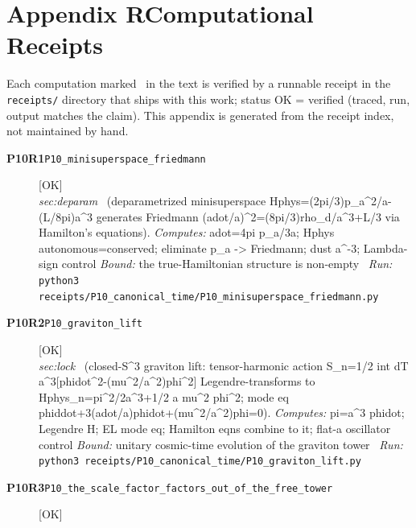 \clearpage
\section*{Appendix R\quad Computational Receipts}\label{app:receipts}
\small\noindent Each computation marked \rcptmarker\ in the text is verified by a runnable receipt in the \texttt{receipts/} directory that ships with this work; status \textsf{OK} = verified (traced, run, output matches the claim). This appendix is generated from the receipt index, not maintained by hand.\par\medskip
\begingroup\renewcommand{\arraystretch}{1.25}
\begin{description}
\item[\textbf{P10R1}\quad\texttt{P10\_minisuperspace\_friedmann}]\hfill\textsf{[OK]}\\
\textit{sec:deparam} \ (deparametrized minisuperspace Hphys=(2pi/3)p\_a\textasciicircum{}2/a-(L/8pi)a\textasciicircum{}3 generates Friedmann (adot/a)\textasciicircum{}2=(8pi/3)rho\_d/a\textasciicircum{}3+L/3 via Hamilton's equations). 
\emph{Computes:} adot=4pi p\_a/3a; Hphys autonomous=conserved; eliminate p\_a -> Friedmann; dust a\textasciicircum{}-3; Lambda-sign control
 \emph{Bound:} the true-Hamiltonian structure is non-empty
\ \emph{Run:} \texttt{python3 receipts/P10\_canonical\_time/P10\_minisuperspace\_friedmann.py}
\item[\textbf{P10R2}\quad\texttt{P10\_graviton\_lift}]\hfill\textsf{[OK]}\\
\textit{sec:lock} \ (closed-S\textasciicircum{}3 graviton lift: tensor-harmonic action S\_n=1/2 int dT a\textasciicircum{}3[phidot\textasciicircum{}2-(mu\textasciicircum{}2/a\textasciicircum{}2)phi\textasciicircum{}2] Legendre-transforms to Hphys\_n=pi\textasciicircum{}2/2a\textasciicircum{}3+1/2 a mu\textasciicircum{}2 phi\textasciicircum{}2; mode eq phiddot+3(adot/a)phidot+(mu\textasciicircum{}2/a\textasciicircum{}2)phi=0). 
\emph{Computes:} pi=a\textasciicircum{}3 phidot; Legendre H; EL mode eq; Hamilton eqns combine to it; flat-a oscillator control
 \emph{Bound:} unitary cosmic-time evolution of the graviton tower
\ \emph{Run:} \texttt{python3 receipts/P10\_canonical\_time/P10\_graviton\_lift.py}
\item[\textbf{P10R3}\quad\texttt{P10\_the\_scale\_factor\_factors\_out\_of\_the\_free\_tower}]\hfill\textsf{[OK]}\\

\end{description}
